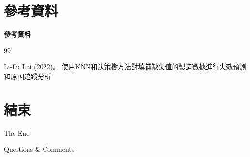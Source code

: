 \documentclass[12pt,aspectratio=43]{beamer}
\begin{document}
\section{參考資料}
\linespread{1}  %
\begin{frame}{\textbf{參考資料}}
\linespread{1.5} %

\footnotesize

\begin{thebibliography}{99} 

		Li-Fu Lai (2022)。 %
		\newblock 使用KNN和決策樹方法對填補缺失值的製造數據進行失效預測和原因追蹤分析 %
		
\end{thebibliography}

\end{frame}

\section*{結束}

\begin{frame}[plain] %
	\begin{center}
		{\Huge The End}
		\bigskip\bigskip 
		
		{\LARGE Questions  \&  Comments}
	\end{center}
\end{frame}
\end{document}

